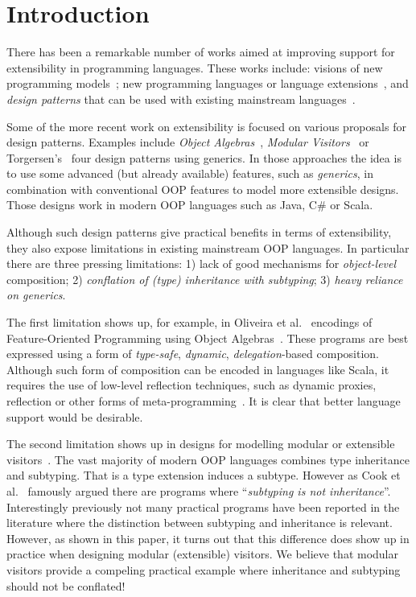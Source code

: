 \section{Introduction}

There has been a remarkable number of works aimed at improving support
for extensibility in programming languages. These works include:
visions of new programming models~\cite{}; new programming languages or
language extensions~\cite{}, and \emph{design patterns} that can be
used with existing mainstream languages~\cite{}.


Some of the more recent work on extensibility is focused on various
proposals for design patterns.  Examples include \emph{Object
  Algebras}~\cite{}, \emph{Modular Visitors}~\cite{} or
Torgersen's~\cite{} four design patterns using generics. In those
approaches the idea is to use some advanced (but already available)
features, such as \emph{generics}, in combination with conventional
OOP features to model more extensible designs.  Those designs work in
modern OOP languages such as Java, C\# or Scala.

Although such design patterns give practical benefits in terms of
extensibility, they also expose limitations in existing mainstream OOP
languages. In particular there are three pressing limitations: 
1) lack of good mechanisms for
  \emph{object-level} composition; 2) \emph{conflation of 
    (type) inheritance with subtyping}; 3) \emph{heavy reliance on generics}.

  The first limitation shows up, for example, in Oliveira et
  al.~\cite{} encodings of Feature-Oriented Programming using Object
  Algebras~\cite{}. These programs are best expressed using a form of
  \emph{type-safe}, \emph{dynamic}, \emph{delegation}-based
  composition. Although such form of composition can be encoded in
  languages like Scala, it requires the use of low-level reflection
  techniques, such as dynamic proxies, reflection or other forms of
  meta-programming~\cite{}. It is clear that better language support
  would be desirable.

  The second limitation shows up in designs for modelling
  modular or extensible visitors~\cite{}.  The vast majority of modern
  OOP languages combines type inheritance and subtyping. 
  That is a type extension induces a subtype. However
  as Cook et al.~\cite{} famously argued there are programs where
  ``\emph{subtyping is not inheritance}''. Interestingly previously
  not many practical programs have been reported in the literature
  where the distinction between subtyping and inheritance is
  relevant. However, as shown in this paper, it turns out that this
  difference does show up in practice when designing modular
  (extensible) visitors.  We believe that modular visitors provide a
  compeling practical example where inheritance and subtyping should
  not be conflated!

